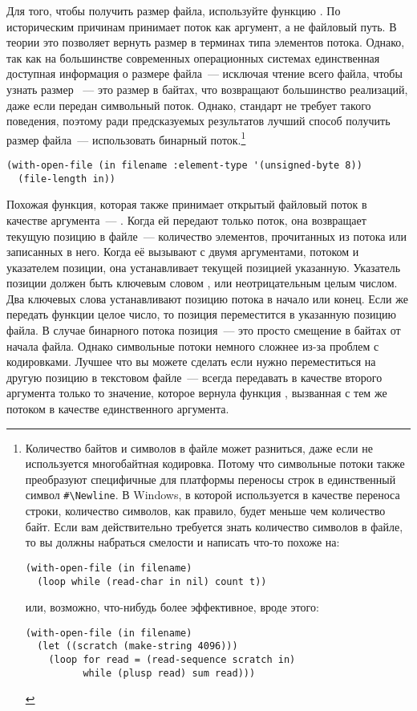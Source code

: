 Для того, чтобы получить размер файла, используйте функцию . По
историческим причинам  принимает поток как аргумент, а не файловый
путь. В теории это позволяет  вернуть размер в терминах типа элементов
потока. Однако, так как на большинстве современных операционных системах единственная
доступная информация о размере файла~--- исключая чтение всего файла, чтобы узнать размер
~--- это размер в байтах, что возвращают большинство реализаций, даже если
 передан символьный поток. Однако, стандарт не требует такого поведения,
поэтому ради предсказуемых результатов лучший способ получить размер файла~--- использовать
бинарный поток.\footnote{Количество байтов и символов в файле может разниться, даже если
  не используется многобайтная кодировка. Потому что символьные потоки также преобразуют
  специфичные для платформы переносы строк в единственный символ \lstinline!#\Newline!. В
  Windows, в которой используется  в качестве переноса строки, количество
  символов, как правило, будет меньше чем количество байт. Если вам действительно
  требуется знать количество символов в файле, то вы должны набраться смелости и написать
  что-то похоже на:

\begin{lstlisting}
(with-open-file (in filename) 
  (loop while (read-char in nil) count t))
\end{lstlisting}

\noindent{}или, возможно, что-нибудь более эффективное, вроде этого:

\begin{lstlisting}
(with-open-file (in filename) 
  (let ((scratch (make-string 4096))) 
    (loop for read = (read-sequence scratch in) 
          while (plusp read) sum read)))
\end{lstlisting}
}

\begin{lstlisting}
(with-open-file (in filename :element-type '(unsigned-byte 8)) 
  (file-length in)) 
\end{lstlisting}

Похожая функция, которая также принимает открытый файловый поток в качестве аргумента~---
. Когда ей передают только поток, она возвращает текущую позицию в
файле~--- количество элементов, прочитанных из потока или записанных в него. Когда её
вызывают с двумя аргументами, потоком и указателем позиции, она устанавливает текущей
позицией указанную. Указатель позиции должен быть ключевым словом ,
 или неотрицательным целым числом. Два ключевых слова устанавливают позицию
потока в начало или конец. Если же передать функции целое число, то позиция переместится в
указанную позицию файла. В случае бинарного потока позиция~--- это просто смещение в байтах
от начала файла. Однако символьные потоки немного сложнее из-за проблем с
кодировками. Лучшее что вы можете сделать если нужно переместиться на другую позицию в
текстовом файле~--- всегда передавать  в качестве второго аргумента
только то значение, которое вернула функция , вызванная с тем же
потоком в качестве единственного аргумента.

